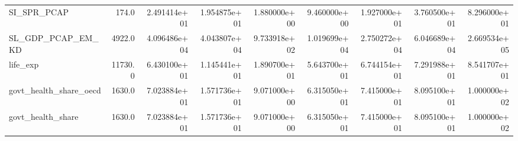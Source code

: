 \begin{tabular}{lrrrrrrrr}
SI\_SPR\_PCAP & 174.0 & 2.491414e+01 & 1.954875e+01 & 1.880000e+00 & 9.460000e+00 & 1.927000e+01 & 3.760500e+01 & 8.296000e+01 \\
SL\_GDP\_PCAP\_EM\_KD & 4922.0 & 4.096486e+04 & 4.043807e+04 & 9.733918e+02 & 1.019699e+04 & 2.750272e+04 & 6.046689e+04 & 2.669534e+05 \\
life\_exp & 11730.0 & 6.430100e+01 & 1.145441e+01 & 1.890700e+01 & 5.643700e+01 & 6.744154e+01 & 7.291988e+01 & 8.541707e+01 \\
govt\_health\_share\_oecd & 1630.0 & 7.023884e+01 & 1.571736e+01 & 9.071000e+00 & 6.315050e+01 & 7.415000e+01 & 8.095100e+01 & 1.000000e+02 \\
govt\_health\_share & 1630.0 & 7.023884e+01 & 1.571736e+01 & 9.071000e+00 & 6.315050e+01 & 7.415000e+01 & 8.095100e+01 & 1.000000e+02 \\
\bottomrule
\end{tabular}
